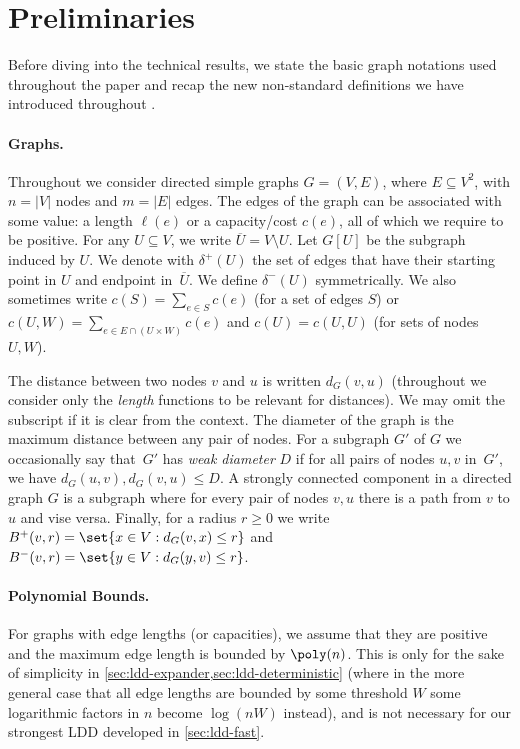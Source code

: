 \section{Preliminaries} \label{sec:prelims}
Before diving into the technical results, we state the basic graph notations used throughout the paper and recap the new non-standard definitions we have introduced throughout .

\paragraph{Graphs.}
Throughout we consider directed simple graphs $G = (V, E)$, where $E \subseteq V^2$, with $n = |V|$ nodes and $m = |E|$ edges. The edges of the graph can be associated with some value: a length $\ell(e)$ or a capacity/cost $c(e)$, all of which we require to be positive. For any $U \subseteq V$, we write $\overline U = V \setminus U$. Let $G[U]$ be the subgraph induced by $U$. We denote with $\delta^{+}(U)$ the set of edges that have their starting point in $U$ and endpoint in~$\overline U$. We define $\delta^{-}(U)$ symmetrically. We also sometimes write $c(S) = \sum_{e \in S} c(e)$ (for a set of edges $S$) or $c(U, W) = \sum_{e \in E \cap (U \times W)} c(e)$ and $c(U) = c(U, U)$ (for sets of nodes $U, W$).

The distance between two nodes $v$ and $u$ is written $d_G(v,u)$ (throughout we consider only the \emph{length} functions to be relevant for distances). We may omit the subscript if it is clear from the context. The diameter of the graph is the maximum distance between any pair of nodes. For a subgraph $G'$ of $G$ we occasionally say that~$G'$ has \emph{weak diameter} $D$ if for all pairs of nodes $u, v$ in~$G'$, we have $d_G(u, v), d_G(v, u) \leq D$. A strongly connected component in a directed graph $G$ is a subgraph where for every pair of nodes $v,u$ there is a path from $v$ to $u$ and vise versa. Finally, for a radius $r \geq 0$ we write $B^+(v, r) = \set{x \in V : d_G(v, x) \leq r}$ and $B^-(v, r) = \set{y \in V : d_G(y, v) \leq r}$.


\paragraph{Polynomial Bounds.}
For graphs with edge lengths (or capacities), we assume that they are positive and the maximum edge length is bounded by $\poly(n)$. This is only for the sake of simplicity in \cref{sec:ldd-expander,sec:ldd-deterministic} (where in the more general case that all edge lengths are bounded by some threshold $W$ some logarithmic factors in $n$ become $\log (nW)$ instead), and is not necessary for our strongest LDD developed in \cref{sec:ldd-fast}.

